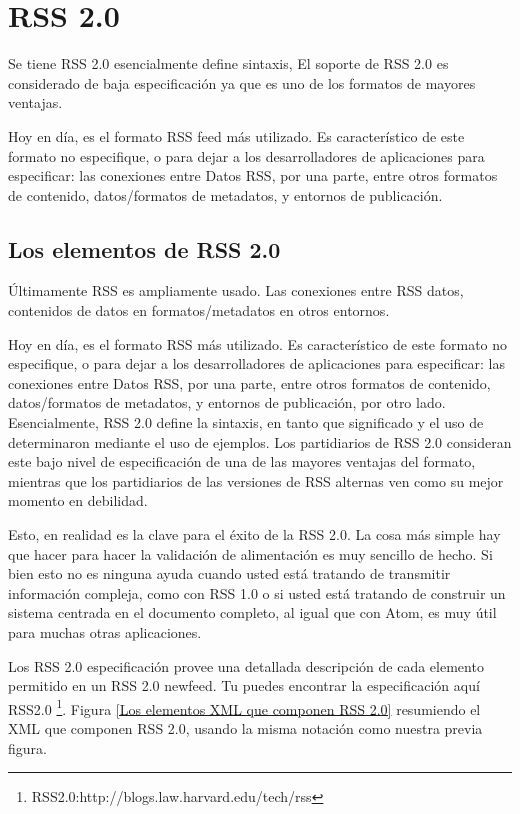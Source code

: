 \section{RSS 2.0}

Se tiene RSS 2.0 esencialmente define sintaxis, El soporte de RSS 2.0 es considerado
de baja especificaci\'{o}n ya que es uno de los formatos de mayores ventajas.

Hoy en d\'{i}a, es el formato RSS feed m\'{a}s utilizado. Es caracter\'{i}stico de
este formato no especifique, o para dejar a los desarrolladores de aplicaciones para
especificar: las conexiones entre Datos RSS, por una parte, entre otros formatos de
contenido, datos/formatos de metadatos, y entornos de publicaci\'{o}n.\cite{wittenbrink2005rss}

\subsection{Los elementos de RSS 2.0}

\'{U}ltimamente RSS es ampliamente usado. Las conexiones entre RSS datos, contenidos
de datos en formatos/metadatos en otros entornos.

Hoy en d\'{i}a, es el formato RSS m\'{a}s utilizado. Es caracter\'{i}stico de este
formato no especifique, o para dejar a los desarrolladores de aplicaciones para 
especificar: las conexiones entre Datos RSS, por una parte, entre otros formatos
de contenido, datos/formatos de metadatos, y entornos de publicaci\'{o}n, por otro
lado. Esencialmente, RSS 2.0 define la sintaxis, en tanto que significado y el uso
de determinaron mediante el uso de ejemplos. Los partidiarios de RSS 2.0 consideran
este bajo nivel de especificaci\'{o}n de una de las mayores ventajas del formato, 
mientras que los partidiarios de las versiones de RSS alternas ven como su mejor
momento en debilidad.\cite{wittenbrink2005rss}

Esto, en realidad es la clave para el \'{e}xito de la RSS 2.0. La cosa m\'{a}s simple
hay que hacer para hacer la validaci\'{o}n de alimentaci\'{o}n es muy sencillo de 
hecho. Si bien esto no es ninguna ayuda cuando usted est\'{a}
tratando de transmitir informaci\'{o}n compleja, como con RSS 1.0 o si usted est\'{a}
tratando de construir un sistema centrada en el documento completo, al igual que con
Atom, es muy \'{u}til para muchas otras aplicaciones.\cite{hammersley2005developing}

Los RSS 2.0 especificación provee una detallada descripci\'{o}n de cada elemento 
permitido en un RSS 2.0 newfeed. Tu puedes encontrar la especificaci\'{o}n aqu\'{i} 
RSS2.0 \footnote{RSS2.0:http://blogs.law.harvard.edu/tech/rss}. Figura \ref{Los 
elementos XML que componen RSS 2.0} resumiendo el XML que componen RSS 2.0, 
usando la misma notaci\'{o}n como nuestra previa figura.\cite{johnson2006rss}

